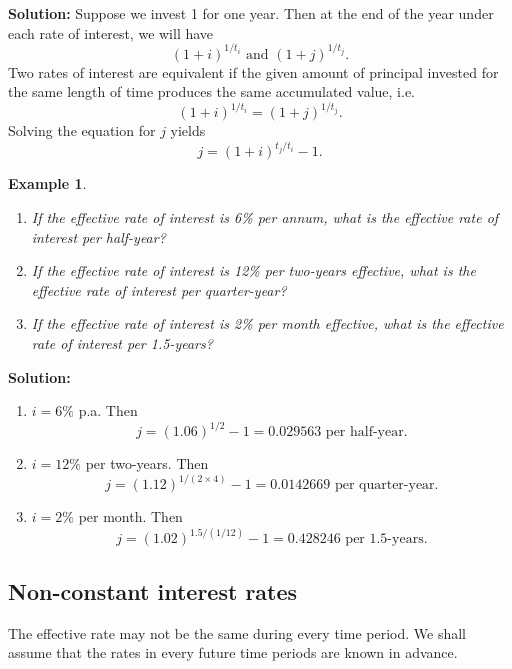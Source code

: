 \documentclass[landscape, 20pt]{extreport}
\theoremstyle{definition}
\theoremstyle{definition}
\newtheorem{example}{Example}[chapter]
\theoremstyle{definition}
\theoremstyle{definition}
\theoremstyle{remark}
\begin{document}
\textbf{Solution:} Suppose we invest 1 for one year. Then at the end of the
year under each rate of interest, we will have
\[(1+i)^{1/t_i} \text{ and } (1+j)^{1/t_j}.\] Two rates of interest are
equivalent if the given amount of principal invested for the same length
of time produces the same accumulated value, i.e.
\[(1+i)^{1/t_i} = (1+j)^{1/t_j}.\] Solving the equation for \(j\) yields
\[j = (1+i)^{t_j/t_i} - 1.\]

\newpage \begin{example}
\protect\hypertarget{exm:unlabeled-div-11}{}\label{exm:unlabeled-div-11}

\begin{enumerate}
\def\labelenumi{\arabic{enumi}.}
\item
  \emph{If the effective rate of interest is 6\% per annum, what is the
  effective rate of interest per half-year?}
\item
  \emph{If the effective rate of interest is 12\% per two-years effective,
  what is the effective rate of interest per quarter-year?}
\item
  \emph{If the effective rate of interest is 2\% per month effective, what
  is the effective rate of interest per 1.5-years?}
\end{enumerate}

\end{example}

\textbf{Solution:}

\begin{enumerate}
\def\labelenumi{\arabic{enumi}.}
\item
  \(i = 6\%\) p.a. Then
  \[j = (1.06)^{1/2} -1 = 0.029563 \text{ per half-year}.\]
\item
  \(i = 12\%\) per two-years. Then
  \[j = (1.12)^{1/(2\times4)} -1 = 0.0142669 \text{ per quarter-year}.\]
\item
  \(i = 2\%\) per month. Then
  \[j = (1.02)^{1.5/(1/12)} -1 = 0.428246 \text{ per 1.5-years}.\]
\end{enumerate}

\hypertarget{non-constant-interest-rates}{%
\subsection{Non-constant interest rates}\label{non-constant-interest-rates}}

The effective rate may not be the same during every time period. We
shall assume that the rates in every future time periods are known in
advance.
\end{document}
